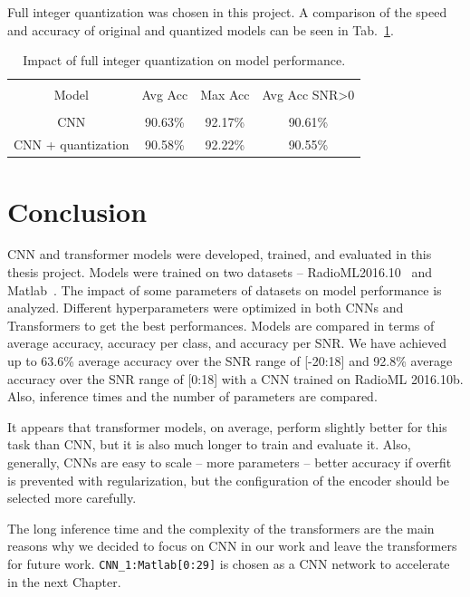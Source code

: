 Full integer quantization was chosen in this project. A comparison of the speed and accuracy of original and quantized models can be seen in Tab.~\ref{table:quant_performance}. %

\begin{table}[h!]
\centering
\begin{tabular}{| c  c  c  c |} 
 \hline \\[-1em]
 Model & Avg Acc & Max Acc & Avg Acc SNR>0 \\ [1ex]  \\[-1em]    
    CNN                 & 90.63\% & 92.17\% & 90.61\%\\ [1ex]
    CNN + quantization  & 90.58\% & 92.22\% & 90.55\%\\ [1ex]
\hline
\end{tabular}
\caption{Impact of full integer quantization on model performance.}
\label{table:quant_performance}
\end{table}

\section{Conclusion}

CNN and transformer models were developed, trained, and evaluated in this thesis project. Models were trained on two datasets -- RadioML2016.10~\cite{cnn_dnn_simc} and Matlab~\cite{matlab_model}. The impact of some parameters of datasets on model performance is analyzed. Different hyperparameters were optimized in both CNNs and Transformers to get the best performances. Models are compared in terms of average accuracy, accuracy per class, and accuracy per SNR. We have achieved up to 63.6\% average accuracy over the SNR range of [-20:18] and 92.8\% average accuracy over the SNR range of [0:18] with a CNN trained on RadioML 2016.10b. Also, inference times and the number of parameters are compared.

It appears that transformer models, on average, perform slightly better for this task than CNN, but it is also much longer to train and evaluate it. Also, generally, CNNs are easy to scale -- more parameters -- better accuracy if overfit is prevented with regularization, but the configuration of the encoder should be selected more carefully. 


The long inference time and the complexity of the transformers are the main reasons why we decided to focus on CNN in our work and leave the transformers for future work. \verb|CNN_1:Matlab[0:29]| is chosen as a CNN network to accelerate in the next Chapter.

